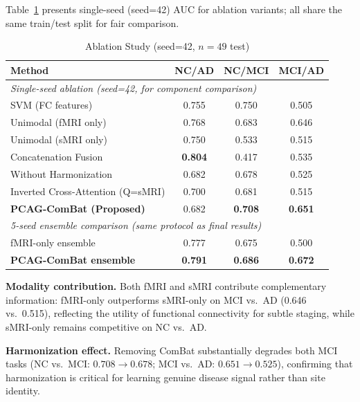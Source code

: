\documentclass[conference]{IEEEtran}
\begin{document}
Table~\ref{tab:ablation} presents single-seed (seed=42) AUC for ablation variants; all share the same train/test split for fair comparison.

\begin{table}[h]
\caption{Ablation Study (seed=42, $n{=}49$ test)}
\label{tab:ablation}
\centering
\begin{tabular}{lccc}
\toprule
Method                               & NC/AD          & NC/MCI         & MCI/AD \\
\midrule
\multicolumn{4}{l}{\textit{Single-seed ablation (seed=42, for component comparison)}} \\
SVM (FC features)                    & 0.755          & 0.750          & 0.505 \\
Unimodal (fMRI only)                 & 0.768          & 0.683          & 0.646 \\
Unimodal (sMRI only)                 & 0.750          & 0.533          & 0.515 \\
Concatenation Fusion                 & \textbf{0.804} & 0.417          & 0.535 \\
Without Harmonization                & 0.682          & 0.678          & 0.525 \\
Inverted Cross-Attention (Q=sMRI)    & 0.700          & 0.681          & 0.515 \\
\textbf{PCAG-ComBat (Proposed)}      & 0.682          & \textbf{0.708} & \textbf{0.651} \\
\midrule
\multicolumn{4}{l}{\textit{5-seed ensemble comparison (same protocol as final results)}} \\
fMRI-only ensemble                   & 0.777          & 0.675          & 0.500 \\
\textbf{PCAG-ComBat ensemble}        & \textbf{0.791} & \textbf{0.686} & \textbf{0.672} \\
\bottomrule
\end{tabular}
\end{table}

\textbf{Modality contribution.} Both fMRI and sMRI contribute complementary information: fMRI-only outperforms sMRI-only on MCI vs.\ AD (0.646 vs.\ 0.515), reflecting the utility of functional connectivity for subtle staging, while sMRI-only remains competitive on NC vs.\ AD.

\textbf{Harmonization effect.} Removing ComBat substantially degrades both MCI tasks (NC vs.\ MCI: $0.708{\to}0.678$; MCI vs.\ AD: $0.651{\to}0.525$), confirming that harmonization is critical for learning genuine disease signal rather than site identity.
\end{document}
